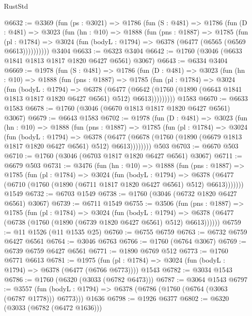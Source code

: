 \begin{lexlean}{RustStd}
\begin{coremodule}
@6632 := @3369
    (fun (ps : @3021) =>
    @1786
      (fun (S : @481) =>
      @1786
        (fun (D : @481) =>
        @3023
          (fun (hn : @10) =>
          @1888
            (fun (pns : @1887) =>
            @1785
              (fun (pl : @1784) =>
              @3024 (fun (bodyL : @1794) => @6378 (@6477 (@6565 (@6569 @6613))))))))))
    @3404
@6633 := @6323 @3404
@6642 := @1760 (@3046 (@6633 @1841 @1813 @1817 @1820 @6427 @6561) @3067)
@6643 := @6334 @3404
@6669 := @1978
    (fun (S : @481) =>
    @1786
      (fun (D : @481) =>
      @3023
        (fun (hn : @10) =>
        @1888
          (fun (pns : @1887) =>
          @1785
            (fun (pl : @1784) =>
            @3024
              (fun (bodyL : @1794) =>
              @6378
                (@6477
                  (@6642
                    (@1760 (@1890 (@6643 @1841 @1813 @1817 @1820 @6427 @6561) @512) @6613)))))))))
    @1583
@6670 := @6633 @1583
@6678 := @1760 (@3046 (@6670 @1813 @1817 @1820 @6427 @6561) @3067)
@6679 := @6643 @1583
@6702 := @1978
    (fun (D : @481) =>
    @3023
      (fun (hn : @10) =>
      @1888
        (fun (pns : @1887) =>
        @1785
          (fun (pl : @1784) =>
          @3024
            (fun (bodyL : @1794) =>
            @6378
              (@6477 (@6678 (@1760 (@1890 (@6679 @1813 @1817 @1820 @6427 @6561) @512) @6613))))))))
    @503
@6703 := @6670 @503
@6710 := @1760 (@3046 (@6703 @1817 @1820 @6427 @6561) @3067)
@6711 := @6679 @503
@6731 := @3476
    (fun (hn : @10) =>
    @1888
      (fun (pns : @1887) =>
      @1785
        (fun (pl : @1784) =>
        @3024
          (fun (bodyL : @1794) =>
          @6378 (@6477 (@6710 (@1760 (@1890 (@6711 @1817 @1820 @6427 @6561) @512) @6613)))))))
    @1549
@6732 := @6703 @1549
@6738 := @1760 (@3046 (@6732 @1820 @6427 @6561) @3067)
@6739 := @6711 @1549
@6755 := @3506
    (fun (pns : @1887) =>
    @1785
      (fun (pl : @1784) =>
      @3024
        (fun (bodyL : @1794) =>
        @6378 (@6477 (@6738 (@1760 (@1890 (@6739 @1820 @6427 @6561) @512) @6613))))))
@6759 := @11 @1526 (@11 @1535 @25)
@6760 := @6755 @6759
@6763 := @6732 @6759 @6427 @6561
@6764 := @3046 @6763
@6766 := @1760 (@6764 @3067)
@6769 := @6739 @6759 @6427 @6561
@6771 := @1890 @6769 @512
@6773 := @1760 @6771 @6613
@6781 := @1975
    (fun (pl : @1784) => @3024 (fun (bodyL : @1794) => @6378 (@6477 (@6766 @6773))))
    @1543
@6782 := @3034 @1543
@6786 := @1760 (@6320 (@3033 (@6782 @6473)))
@6787 := @3064 @1543
@6797 := @3557
    (fun (bodyL : @1794) => @6378 (@6786 (@1760 (@6764 (@3063 (@6787 @1778))) @6773)))
    @1636
@6798 := @1926 @6377
@6802 := @6320 (@3033 (@6782 (@6472 @1636)))

\end{coremodule}
\end{lexlean}
